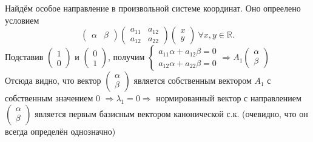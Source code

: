 \documentclass[a4paper, 12pt]{article}
\theoremstyle{definition}
\begin{document}
	Найдём особое направление в произвольной системе координат. Оно опреелено условием $$\begin{pmatrix} \alpha & \beta \end{pmatrix}\begin{pmatrix}a_{11}&a_{12}\\a_{12}&a_{22}\end{pmatrix}\begin{pmatrix} x \\ y \end{pmatrix} \ \forall x, y\in \mathbb{R}.$$
	Подставив $\begin{pmatrix} 1 \\ 0 \end{pmatrix}$ и $\begin{pmatrix} 0 \\ 1 \end{pmatrix}$, получим $\begin{cases}a_{11}\alpha + a_{12}\beta= 0\\a_{12}\alpha + a_{22}\beta = 0\end{cases} \Rightarrow A_1 \begin{pmatrix} \alpha \\  \beta \end{pmatrix}$\\
	Отсюда видно, что вектор $\begin{pmatrix} \alpha \\\beta  \end{pmatrix}$ является собственным вектором $A_1$ с собственным значением 0 $\Rightarrow \lambda_1 = 0 \Rightarrow$ нормированный вектор с направлением $\begin{pmatrix} \alpha \\\beta  \end{pmatrix}$ является первым базисным вектором канонической с.к. (очевидно, что он всегда определён однозначно)
\end{document}
